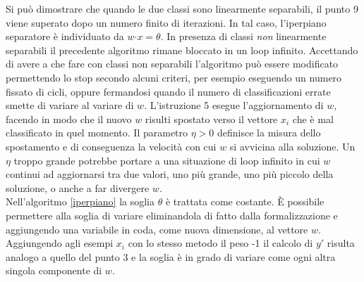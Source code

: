 \documentclass [11pt,a4paper,twoside,openright] {book}
\begin{document}
Si può dimostrare \cite{rosenblatt1958perceptron} che quando le due classi sono linearmente separabili, il punto 9 viene superato dopo un numero finito di iterazioni. In tal caso, l'iperpiano separatore è individuato da $w \boldsymbol{ \cdot} x = \theta$. In presenza di classi \textit{non} linearmente separabili il precedente algoritmo rimane bloccato in un loop infinito. Accettando di avere a che fare con classi non separabili l'algoritmo può essere modificato permettendo lo stop secondo alcuni criteri, per esempio eseguendo un numero fissato di cicli, oppure fermandosi quando il numero di classificazioni errate smette di variare al variare di $w$. L'istruzione 5 esegue l'aggiornamento di $w$, facendo in modo che il nuovo $w$ risulti spostato verso il vettore $x_i$ che è mal classificato in quel momento. Il parametro $\eta > 0$ definisce la misura dello spostamento e di conseguenza la velocità con cui $w$ si avvicina alla soluzione. Un $\eta$ troppo grande potrebbe portare a una situazione di loop infinito in cui $w$ continui ad aggiornarsi tra due valori, uno più grande, uno più piccolo della soluzione, o anche a far divergere $w$.\\
Nell'algoritmo \ref{iperpiano} la soglia $\theta$ è trattata come costante. È possibile permettere alla soglia di variare eliminandola di fatto dalla formalizzazione e aggiungendo una variabile in coda, come nuova dimensione, al vettore $w$. Aggiungendo agli esempi $x_i$ con lo stesso metodo il peso -1 il calcolo di $y'$ risulta analogo a quello del punto 3 e la soglia è in grado di variare come ogni altra singola componente di $w$.
\end{document}
